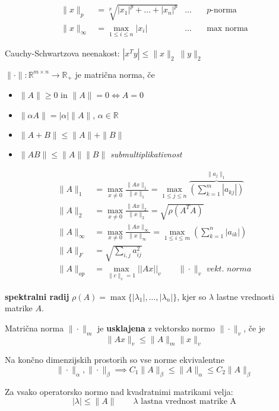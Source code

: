 \begin{multicols}{4}
\begin{align*}
	\| x\|_p &= \sqrt[p]{|x_1|^p + \dots + |x_n|^p} & \dots \quad & p\text{-norma} \\
	\| x \|_\infty &= \max\limits_{1 \leq i \leq n} |x_i| & \dots \quad & \text{max norma}
\end{align*}

Cauchy-Schwartzova neenakost: $|x^T y| \leq \|x\|_2\ \|y\|_2$

$\|\cdot \| : \mathbb{R}^{m \times n} \to \mathbb{R}_+$ je matrična norma, če
\begin{itemize}
	\item $\| A \| \geq 0$ in $\| A \| = 0 \iff A = 0$
	\item $\| \alpha A \| = |\alpha| \| A \|$, $\alpha \in \mathbb{R}$
	\item $\| A + B \| \leq \| A \| + \| B \|$
	\item $\| A  B \| \leq \| A \|  \| B \|$ \textit{submultiplikativnost}
\end{itemize}

\begin{align*}
	\| A \|_1 &= \max_{x\neq 0} \frac{\| Ax\|_1}{\|x\|_1} = \max_{1 \leq j \leq n} \overbrace{\left( \sum_{k=1}^m |a_{kj}| \right)}^{\| a_j\|_1}\\
	\| A \|_2 &= \max_{x\neq 0} \frac{\| Ax\|_2}{\|x\|_2} =\sqrt{\rho (A^T A)} \\
	\| A \|_\infty &= \max_{x\neq 0} \frac{\| Ax\|_\infty}{\|x\|_\infty} = \max\limits_{1 \leq i \leq m} \left( \sum_{k=1}^n |a_{ik}| \right) \\
	\| A \|_F &= \sqrt{\sum_{i,j} a_{ij}^2}\\
	\| A \|_{op} &= \max_{\|c\|_v = 1} || A x ||_v \qquad \textit{$\|\cdot \|_v$ vekt. norma}
\end{align*}

\textbf{spektralni radij} $\rho(A) = \max\{ |\lambda_1|, \dots, |\lambda_n| \}$, kjer so $\lambda$ lastne vrednosti matrike $A$.

Matrična norma $\| \cdot \|_m$ je \textbf{usklajena} z vektorsko normo $\|\cdot \|_v$, če je
\[ \| Ax \|_v \leq \| A \|_m \| x \|_v \]


Na končno dimenzijskih prostorih so vse norme ekvivalentne
\[ \| \cdot \|_\alpha, \| \cdot \|_\beta \implies C_1 \| A \|_\beta \leq \| A \|_\alpha \leq C_2 \| A \|_\beta \]

Za vsako operatorsko normo nad kvadratnimi matrikami velja:
\[ |\lambda | \leq \|A\| \qquad \lambda \text{ lastna vrednost matrike A}\]
\end{multicols}
